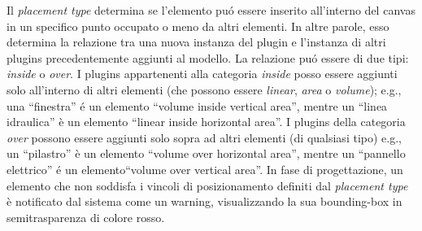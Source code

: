 Il \emph{placement type} determina se l'elemento pu\'o essere inserito all'interno del canvas in un specifico punto occupato o meno
da altri elementi. In altre parole, esso determina la relazione tra una nuova instanza del plugin e l'instanza di altri
plugins precedentemente aggiunti al modello. La relazione pu\'o essere di due tipi: \emph{inside} o \emph{over}.
I plugins appartenenti alla categoria \emph{inside} posso essere aggiunti solo all'interno di altri elementi (che possono essere
\emph{linear}, \emph{area} o \emph{volume}); e.g., una ``finestra'' \'e un elemento ``volume inside vertical area'',
mentre un ``linea idraulica'' \`e un elemento ``linear inside horizontal area''.
I plugins della categoria \emph{over} possono essere aggiunti solo sopra ad altri elementi (di qualsiasi tipo)
e.g., un ``pilastro'' \`e un elemento ``volume over horizontal area'',
mentre un ``pannello elettrico'' \'e un elemento``volume over vertical area''.
In fase di progettazione, un elemento che non soddisfa i vincoli di posizionamento definiti dal \emph{placement type} \`e
notificato dal sistema come un warning, visualizzando la sua bounding-box in semitrasparenza di colore rosso.
